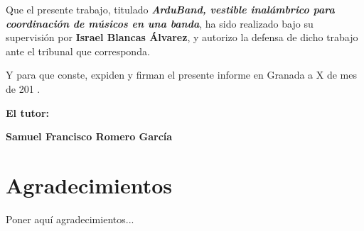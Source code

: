 Que el presente trabajo, titulado \textit{\textbf{ArduBand, vestible inalámbrico para coordinación de músicos en una banda}},
ha sido realizado bajo su supervisión por \textbf{Israel Blancas Álvarez}, y autorizo la defensa de dicho trabajo ante el tribunal
que corresponda.

\vspace{0.5cm}

Y para que conste, expiden y firman el presente informe en Granada a X de mes de 201 .

\vspace{1cm}

\textbf{El tutor:}

\vspace{5cm}

\noindent \textbf{Samuel Francisco Romero García}

\chapter*{Agradecimientos}
\thispagestyle{empty}

       \vspace{1cm}


Poner aquí agradecimientos...
